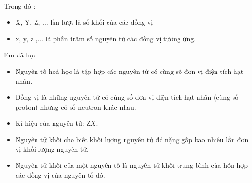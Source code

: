 \\
Trong đó :
\begin{itemize}
	\item X, Y, Z, $\ldots$ lần lượt là số khối của các đồng vị
	\item x, y, z ,$\ldots$ là phần trăm số nguyên tử các đồng vị tương ứng.
\end{itemize}
\begin{tongket}{Em đã học}
	\begin{itemize}
		\item  Nguyên tố hoá học là tập hợp các nguyên tử có cùng số đơn vị điện tích hạt nhân.
		\item  Đồng vị là những nguyên tử có cùng số đơn vị điện tích hạt nhân (cùng số proton) nhưng có số neutron khác nhau.
		\item  Kí hiệu của nguyên tử: $\mathrm{Z} X$.
		\item  Nguyên tử khối cho biết khối lượng nguyên tử đó nặng gấp bao nhiêu lần đơn vị khối lượng nguyên tử.
		\item  Nguyên tử khối của một nguyên tố là nguyên tử khối trung bình của hỗn hợp các đồng vị của nguyên tố đó.
	\end{itemize}
\end{tongket}